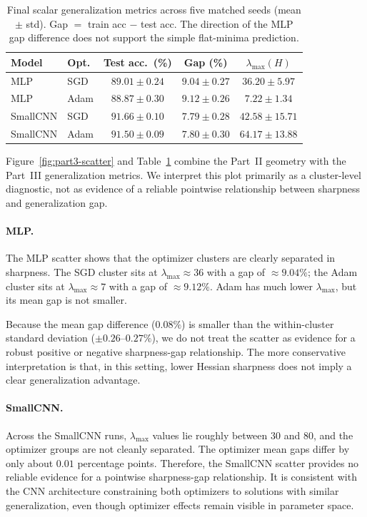 \documentclass[11pt]{article}
\begin{document}
\begin{table}[H]
\centering
\caption{Final scalar generalization metrics across five matched seeds
  (mean $\pm$ std).
  Gap $=$ train acc $-$ test acc.
  The direction of the MLP gap difference does not support the simple flat-minima prediction.}
\label{tab:part3-scalar}
\small
\setlength{\tabcolsep}{5pt}
\begin{tabular}{llccc}
\toprule
Model    & Opt. & Test acc.\ (\%)     & Gap (\%)           & $\lambda_{\max}(H)$ \\
\midrule
MLP      & SGD  & $89.01 \pm 0.24$   & $9.04 \pm 0.27$    & $36.20 \pm 5.97$  \\
MLP      & Adam & $88.87 \pm 0.30$   & $9.12 \pm 0.26$    & $7.22  \pm 1.34$  \\
SmallCNN & SGD  & $91.66 \pm 0.10$   & $7.79 \pm 0.28$    & $42.58 \pm 15.71$ \\
SmallCNN & Adam & $91.50 \pm 0.09$   & $7.80 \pm 0.30$    & $64.17 \pm 13.88$ \\
\bottomrule
\end{tabular}
\end{table}

Figure~\ref{fig:part3-scatter} and Table~\ref{tab:part3-scalar} combine the Part~II geometry with the Part~III generalization metrics. We interpret this plot primarily as a cluster-level diagnostic, not as evidence of a reliable pointwise relationship between sharpness and generalization gap.

\paragraph{MLP.}
The MLP scatter shows that the optimizer clusters are clearly separated in sharpness. The SGD cluster sits at $\lambda_{\max} \approx 36$ with a gap of $\approx 9.04\%$; the Adam cluster sits at $\lambda_{\max} \approx 7$ with a gap of $\approx 9.12\%$. Adam has much lower $\lambda_{\max}$, but its mean gap is not smaller.

Because the mean gap difference ($0.08\%$) is smaller than the within-cluster standard deviation ($\pm 0.26$--$0.27\%$), we do not treat the scatter as evidence for a robust positive or negative sharpness-gap relationship. The more conservative interpretation is that, in this setting, lower Hessian sharpness does not imply a clear generalization advantage.

\paragraph{SmallCNN.}
Across the SmallCNN runs, $\lambda_{\max}$ values lie roughly between $30$ and $80$, and the optimizer groups are not cleanly separated. The optimizer mean gaps differ by only about $0.01$ percentage points. Therefore, the SmallCNN scatter provides no reliable evidence for a pointwise sharpness-gap relationship. It is consistent with the CNN architecture constraining both optimizers to solutions with similar generalization, even though optimizer effects remain visible in parameter space.
\end{document}
